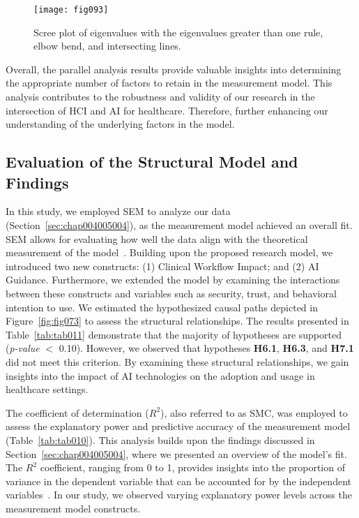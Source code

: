 \begin{figure}[htpb]
\centering
\texttt{[image: fig093]}
\caption{Scree plot of eigenvalues with the eigenvalues greater than one rule, elbow bend, and intersecting lines.}
\label{fig:fig093}
\end{figure}

Overall, the parallel analysis results provide valuable insights into determining the appropriate number of factors to retain in the measurement model.
This analysis contributes to the robustness and validity of our research in the intersection of \ac{HCI} and \ac{AI} for healthcare.
Therefore, further enhancing our understanding of the underlying factors in the model.

\subsection{Evaluation of the Structural Model and Findings}
\label{chap:app003004004}

In this study, we employed \ac{SEM} to analyze our data (Section~\ref{sec:chap004005004}), as the measurement model achieved an overall fit.
\ac{SEM} allows for evaluating how well the data align with the theoretical measurement of the model~\cite{doi:10.1080/10705511.2017.1401932}.
Building upon the proposed research model, we introduced two new constructs:
(1) Clinical Workflow Impact; and
(2) \ac{AI} Guidance.
Furthermore, we extended the model by examining the interactions between these constructs and variables such as security, trust, and behavioral intention to use.
We estimated the hypothesized causal paths depicted in Figure~\ref{fig:fig073} to assess the structural relationships.
The results presented in Table~\ref{tab:tab011} demonstrate that the majority of hypotheses are supported ({\it p-value} $<$ 0.10).
However, we observed that hypotheses {\bf H6.1}, {\bf H6.3}, and {\bf H7.1} did not meet this criterion.
By examining these structural relationships, we gain insights into the impact of \ac{AI} technologies on the adoption and usage in healthcare settings.



The coefficient of determination ($R^2$), also referred to as \ac{SMC}, was employed to assess the explanatory power and predictive accuracy of the measurement model (Table~\ref{tab:tab010}).
This analysis builds upon the findings discussed in Section~\ref{sec:chap004005004}, where we presented an overview of the model's fit.
The $R^2$ coefficient, ranging from 0 to 1, provides insights into the proportion of variance in the dependent variable that can be accounted for by the independent variables~\cite{doi:10.1080/10705511.2017.1401932}.
In our study, we observed varying explanatory power levels across the measurement model constructs.

